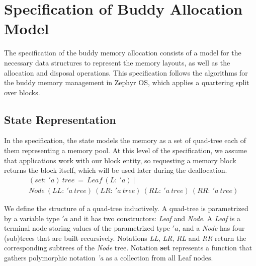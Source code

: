 \section{Specification of Buddy Allocation Model}\label{sec:spec}
The specification of the buddy memory allocation consists of a model for the necessary data structures to represent the memory layouts, as well as the allocation and disposal operations. This specification follows the algorithms for the buddy memory management in Zephyr OS, which applies a quartering split over blocks.

\subsection{State Representation}
\label{statedes}
{In the specification, the state models the memory as a set of  quad-tree each of them representing a memory pool. At this level of the specification, we assume that applications work with our block entity, so requesting a memory block returns the block itself, which will be used later during the deallocation.}
\begin{align*}
&(set:\ 'a)\ tree\ =\ Leaf\ (L:\ 'a)\ | \\
&Node\ (LL:\ 'a\ tree)\ (LR:\ 'a\ tree)\ (RL:\ 'a\ tree)\ (RR:\ 'a\ tree)
\end{align*}

We define the structure of a quad-tree inductively. A quad-tree is parametrized by a variable type $'a$ and it has two constructors: \emph{Leaf} and \emph{Node}. {A \emph{Leaf} is a terminal node storing values of the parametrized type $'a$, and a \emph{Node} has four (sub)trees that are built recursively.} Notations \emph{LL}, \emph{LR}, \emph{RL} and \emph{RR} return the corresponding subtrees of the \emph{Node} tree. Notation \textbf{set} {represents} a function that gathers polymorphic notation \emph{'a} as a collection from all Leaf nodes.

